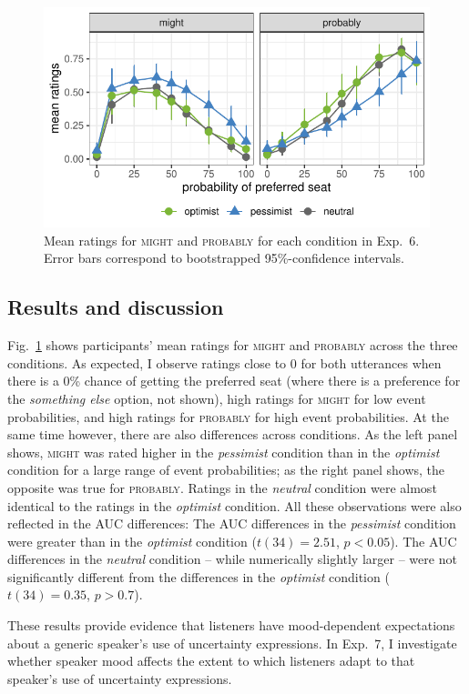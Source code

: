 \begin{figure}[t]
    \centering
    \includegraphics[width=0.75\columnwidth, trim={0 0.75cm 0 0cm}]{./plots/norming.pdf}
    \caption{Mean ratings for \textsc{might} and \textsc{probably} for each condition in Exp.~6. Error bars correspond to bootstrapped 95\%-confidence intervals.}
    \label{fig:results-exp6}
\end{figure}

\subsection{Results and discussion}

Fig.~\ref{fig:results-exp6} shows participants' mean ratings for \textsc{might} and \textsc{probably} across the three conditions. As expected, I observe ratings close to 0 for both utterances when there is a 0\% chance of getting the preferred seat (where there is a preference for the \textit{something else} option, not shown), high ratings for \textsc{might} for low event probabilities, and high ratings for \textsc{probably} for high event probabilities. At the same time however, there are also differences across conditions. As the left panel shows, \textsc{might} was rated higher in the \textit{pessimist} condition than in the \textit{optimist} condition for a large range of event probabilities; as the right panel shows, the opposite was true for \textsc{probably}. Ratings in the \textit{neutral} condition were almost identical to the ratings in the \textit{optimist} condition. All these observations were also reflected in the AUC differences: The AUC differences in the \textit{pessimist} condition were greater than in the \textit{optimist} condition ($t(34)=2.51$, $p < 0.05$). The AUC differences in the \textit{neutral} condition -- while numerically slightly larger -- were not significantly different from the differences in the \textit{optimist} condition ($t(34)=0.35$, $p>0.7$).

These results provide evidence that listeners have mood-dependent expectations about a generic speaker's use of uncertainty expressions. In Exp.~7, I investigate whether  speaker mood affects the extent to which listeners adapt to that speaker's use of uncertainty expressions.  %

